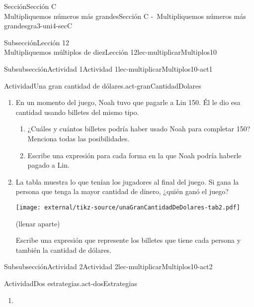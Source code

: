 \begin{sectionptx}{Sección}{{\Large Sección C\\}Multipliquemos números más grandes}{}{Sección C -~Multipliquemos números más grandes}{}{}{gra3-uni4-secC}
\begin{subsectionptx}{Subsección}{{\normalsize Lección 12\\[-0.05cm]}Multipliquemos múltiplos de diez}{}{Lección 12}{}{}{lec-multiplicarMultiplos10}
\begin{subsubsectionptx}{Subsubsección}{Actividad 1}{}{Actividad 1}{}{}{lec-multiplicarMultiplos10-act1}
\begin{activity}{Actividad}{Una gran cantidad de dólares.}{act-granCantidadDolares}
\begin{enumerate}
\begin{multicols}{2}
Cada jugador recibió \textdollar{}100 para empezar. ¿Cuáles de los siguientes podrían ser los billetes que recibió cada jugador?%
\par
Escribe una expresión que represente los billetes de juguete y escribe la cantidad de dólares.%
\vfill\columnbreak
\begin{image}{0}{1}{0}{}%
\texttt{[image: external/tikz-source/unaGranCantidadDeDolares-tab1.pdf]}
\end{image}%
\hfill(llenar aparte)
\end{multicols}
\item{}En un momento del juego, Noah tuvo que pagarle a Lin \textdollar{}150. Él le dio esa cantidad usando billetes del mismo tipo.%
%
\begin{enumerate}
\item{}¿Cuáles y cuántos billetes podría haber usado Noah para completar \textdollar{}150? Menciona todas las posibilidades.%
\item{}Escribe una expresión para cada forma en la que Noah podría haberle pagado a Lin.%
\end{enumerate}
\clearpage
\vspace{-2ex}
\item{}
\begin{multicols}{2}
La tabla muestra lo que tenían los jugadores al final del juego. Si gana la persona que tenga la mayor cantidad de dinero, ¿quién ganó el juego?%
\vfill\columnbreak
\begin{image}{0}{1}{0}{}%
\texttt{[image: external/tikz-source/unaGranCantidadDeDolares-tab2.pdf]}
\end{image}%
\hfill(llenar aparte)
\end{multicols}
Escribe una expresión que represente los billetes que tiene cada persona y también la cantidad de dólares.%
\end{enumerate}
\end{activity}%
\end{subsubsectionptx}
%
%
\typeout{************************************************}
\typeout{************************************************}
%
\begin{subsubsectionptx}{Subsubsección}{Actividad 2}{}{Actividad 2}{}{}{lec-multiplicarMultiplos10-act2}
\begin{activity}{Actividad}{Dos estrategias.}{act-dosEstrategias}%
%
\begin{enumerate}
\item{}

\end{enumerate}
\end{activity}
\end{subsubsectionptx}
\end{subsectionptx}
\end{sectionptx}
